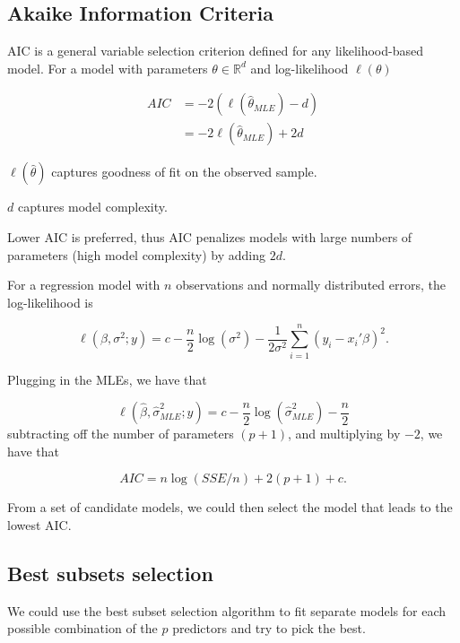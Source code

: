 \documentclass[
  letterpaper,
  DIV=11,
  numbers=noendperiod]{scrreport}
\begin{document}
\hypertarget{akaike-information-criteria}{%
\subsection{Akaike Information
Criteria}\label{akaike-information-criteria}}

AIC is a general variable selection criterion defined for any
likelihood-based model. For a model with parameters
\(\theta \in \mathbb R^d\) and log-likelihood \(\ell (\theta)\)

\[\begin{aligned}AIC & = -2 \left(\ell(\hat \theta_{MLE}) - d\right) \\ 
& = -2 \ell (\hat \theta_{MLE}) + 2d \end{aligned}\]

\(\ell(\hat \theta)\) captures goodness of fit on the observed sample.

\(d\) captures model complexity.

Lower AIC is preferred, thus AIC penalizes models with large numbers of
parameters (high model complexity) by adding \(2d\).

For a regression model with \(n\) observations and normally distributed
errors, the log-likelihood is

\[\ell(\beta, \sigma^2 ; y) = c - \frac{n}{2} \log(\sigma^2) - \frac{1}{2\sigma^2} 
\sum_{i=1}^n (y_i - x_i' \beta)^2.\]

Plugging in the MLEs, we have that

\[\ell(\hat \beta, \hat \sigma^2_{MLE}; y) = c - \frac{n}{2} \log(\hat \sigma^2_{MLE}) - \frac{n}{2}\]
subtracting off the number of parameters \((p+1)\), and multiplying by
\(-2\), we have that

\[AIC = n \log(SSE/n) + 2(p+1) + c.\]

From a set of candidate models, we could then select the model that
leads to the lowest AIC.

\hypertarget{best-subsets-selection}{%
\subsection{Best subsets selection}\label{best-subsets-selection}}

We could use the best subset selection algorithm to fit separate models
for each possible combination of the \(p\) predictors and try to pick
the best.
\end{document}
